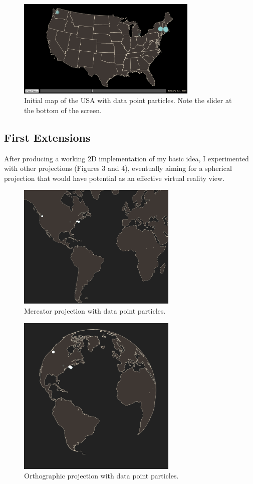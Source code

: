 \documentclass[conference]{acmsiggraph}
\begin{document}
\begin{figure}
  \centering
  \includegraphics[width=3.4in]{images/initial_us_map}
  \caption{Initial map of the USA with data point particles. Note the slider at
           the bottom of the screen.}
\end{figure}

\subsection{First Extensions}

After producing a working 2D implementation of my basic idea, I experimented
with other projections (Figures 3 and 4), eventually aiming for a spherical
projection that would have potential as an effective virtual reality view.

\begin{figure}
  \centering
  \includegraphics[width=3.0in]{images/mercator_projection_with_particles}
  \caption{Mercator projection with data point particles.}
\end{figure}

\begin{figure}
  \centering
  \includegraphics[width=3.0in]{images/orthographic_projection_with_particles}
  \caption{Orthographic projection with data point particles.}
\end{figure}
\end{document}
